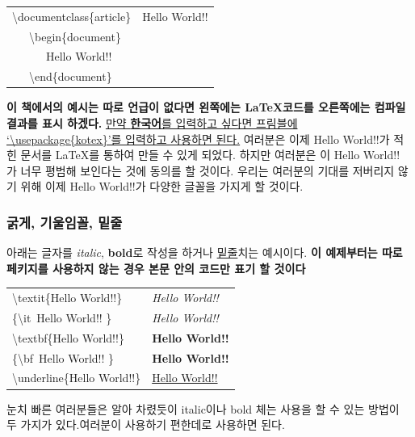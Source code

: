 \documentclass[12pt]{article}
\begin{document}
		\begin{tabularx}{\textwidth \onehalfspacing}{ |X|X| }		
			\hline
			\textbackslash documentclass\{article\}&Hello World!!\\
			\ \ \ \textbackslash begin\{document\}		& \\
			\ \ \ \ \ \ Hello World!!			& \\
			\ \ \ \textbackslash end\{document\}			& \\
			\hline
		\end{tabularx}
		\newline
		\newline
	{\bf 이 책에서의 예시는 따로 언급이 없다면 왼쪽에는 \LaTeX 코드를 오른쪽에는 컴파일 결과를 표시 하겠다.}\newline
	\underline{만약 {\bf 한국어}를 입력하고 싶다면 프림블에 `\textbackslash usepackage\{kotex\}'를 입력하고 사용하면 된다.}\newline\newline
	여러분은 이제 Hello World!!가 적힌 문서를 \LaTeX 를 통하여 만들 수 있게 되었다. 하지만 여러분은 이 Hello World!! 가 너무 평범해 보인다는 것에 동의를 할 것이다. 우리는 여러분의 기대를 저버리지 않기 위해 이제 Hello World!!가 다양한 글꼴을 가지게 할 것이다.
	\subsubsection{굵게, 기울임꼴, 밑줄}
	아래는 글자를 {\it italic}, {\bf bold}로 작성을 하거나 \underline{밑줄}치는 예시이다.
	\newline
	{\bf 이 예제부터는 따로 페키지를 사용하지 않는 경우 본문 안의 코드만 표기 할 것이다}\newline
	
	\begin{tabularx}{\textwidth \onehalfspacing}{ |X|X| }
		\hline
		\textbackslash textit\{Hello World!!\} & \textit{Hello World!!}\\
		\{\textbackslash it\ Hello World!! \} & {\it Hello World!!}\\
		\hline
		\textbackslash textbf\{Hello World!!\} & \textbf{Hello World!!}\\
		\{\textbackslash bf\ Hello World!! \} & {\bf Hello World!!}\\
		\hline
		\textbackslash underline\{Hello World!!\} & \underline{Hello World!!}\\
		\hline
	\end{tabularx}
	\newline
	\newline
	눈치 빠른 여러분들은 알아 차렸듯이 italic이나 bold 체는 사용을 할 수 있는 방법이 두 가지가 있다.여러분이 사용하기 편한데로 사용하면 된다.
	\clearpage
\end{document}

